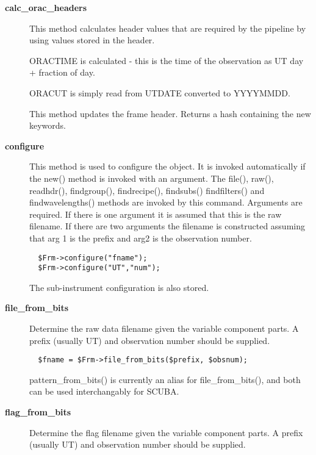 \begin{description}

\item[\textbf{calc\_orac\_headers}] \mbox{}

This method calculates header values that are required by the
pipeline by using values stored in the header.



ORACTIME is calculated - this is the time of the observation as
UT day + fraction of day.



ORACUT is simply read from UTDATE converted to YYYYMMDD.



This method updates the frame header.
Returns a hash containing the new keywords.


\item[\textbf{configure}] \mbox{}

This method is used to configure the object. It is invoked
automatically if the new() method is invoked with an argument. The
file(), raw(), readhdr(), findgroup(), findrecipe(), findsubs() 
findfilters() and findwavelengths() methods are
invoked by this command. Arguments are required.
If there is one argument it is assumed that this is the
raw filename. If there are two arguments the filename is
constructed assuming that arg 1 is the prefix and arg2 is the
observation number.

\begin{verbatim}
  $Frm->configure("fname");
  $Frm->configure("UT","num");
\end{verbatim}


The sub-instrument configuration is also stored.


\item[\textbf{file\_from\_bits}] \mbox{}

Determine the raw data filename given the variable component
parts. A prefix (usually UT) and observation number should
be supplied.

\begin{verbatim}
  $fname = $Frm->file_from_bits($prefix, $obsnum);
\end{verbatim}


pattern\_from\_bits() is currently an alias for file\_from\_bits(),
and both can be used interchangably for SCUBA.


\item[\textbf{flag\_from\_bits}] \mbox{}

Determine the flag filename given the variable component
parts. A prefix (usually UT) and observation number should
be supplied.


\end{description}
